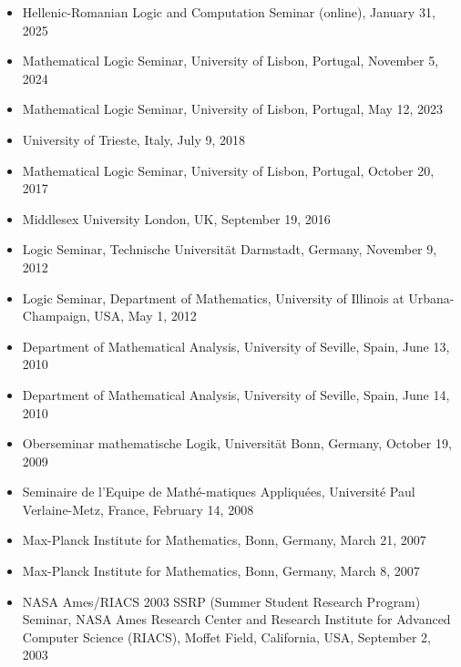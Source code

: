 \documentclass[12pt]{article}
\begin{document}
\begin{itemize}

\item Hellenic-Romanian Logic and Computation Seminar (online), January 31, 2025

\item Mathematical Logic Seminar, University of Lisbon, Portugal, November 5, 2024

\item Mathematical Logic Seminar, University of Lisbon, Portugal, May 12, 2023

\item University of Trieste, Italy, July 9, 2018

\item Mathematical Logic Seminar, University of Lisbon, Portugal, October 20, 2017

\item Middlesex University London, UK, September 19, 2016

\item Logic Seminar, Technische Universit\"{a}t Darmstadt, Germany, November 9, 2012

\item Logic Seminar, Department of Mathematics, University of Illinois at Urbana-\\Champaign, USA,  
May 1, 2012

\item Department of Mathematical Analysis, University of Seville, Spain, June 13, 2010

\item Department of Mathematical Analysis, University of Seville, Spain, June 14, 2010

\item Oberseminar mathematische Logik, Universit\" at Bonn, Germany, October 19, 2009

\item Seminaire  de l'Equipe de Math\' e-matiques Appliqu\' ees, Universit\' e Paul Verlaine-Metz, 
France, February 14, 2008

\item Max-Planck Institute for Mathematics, Bonn, Germany, March 21, 2007

\item Max-Planck Institute for Mathematics, Bonn, Germany, March 8, 2007

\item  NASA Ames/RIACS 2003 SSRP (Summer Student Research Program)  Seminar, 
 NASA Ames Research Center and 
Research Institute for Advanced Computer Science (RIACS), 
Moffet Field, California, USA, September 2, 2003


\end{itemize}
\end{document}
